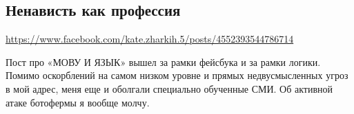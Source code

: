  
 
 
 
 

\subsection{Ненависть как профессия}
\url{https://www.facebook.com/kate.zharkih.5/posts/4552393544786714}

Пост про «МОВУ И ЯЗЫК» вышел за рамки фейсбука и за рамки логики. Помимо
оскорблений на самом низком уровне и прямых недвусмысленных угроз в мой адрес,
меня еще и оболгали специально обученные СМИ. Об активной атаке ботофермы я
вообще молчу.

